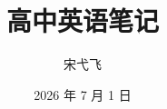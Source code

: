 \documentclass[12pt, a4paper, twoside, openright, fontset=fandol]{ctexbook}
\title{\Huge\bfseries 高中英语笔记}
\author{宋弋飞}
\date{2026 年 7 月 1 日}
\begin{document}
\frontmatter
\maketitle

\begingroup
\let\cleardoublepage\clearpage

\endgroup

\tableofcontents

\mainmatter




% 

\end{document}
